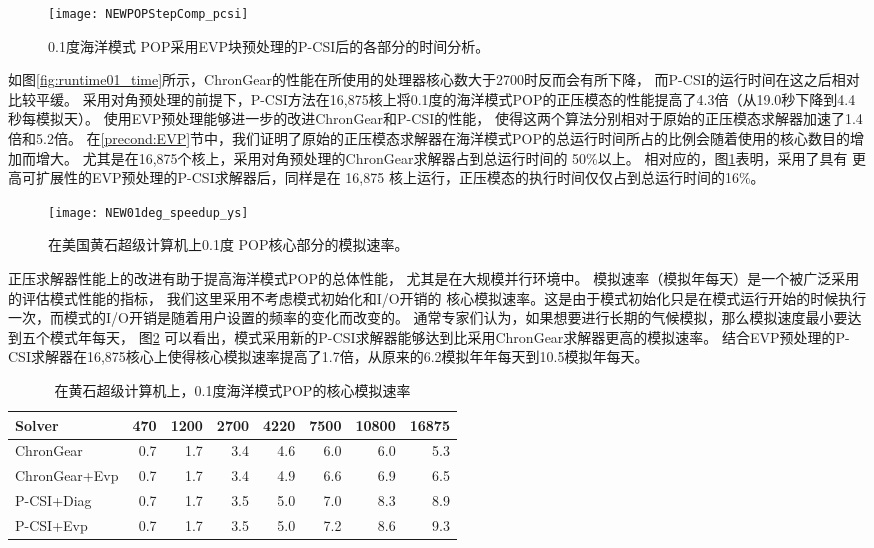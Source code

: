 \begin {figure}
\centering
\texttt{[image: NEWPOPStepComp\_pcsi]}
\caption[] { 0.1度海洋模式 POP采用EVP块预处理的P-CSI后的各部分的时间分析。 \label{fig:StepComp_pcsi}}
\end{figure}

如图\ref{fig:runtime01_time}所示，ChronGear的性能在所使用的处理器核心数大于2700时反而会有所下降，
而P-CSI的运行时间在这之后相对比较平缓。 
采用对角预处理的前提下，P-CSI方法在16,875核上将0.1度的海洋模式POP的正压模态的性能提高了4.3倍（从19.0秒下降到4.4秒每模拟天）。 
使用EVP预处理能够进一步的改进ChronGear和P-CSI的性能， 使得这两个算法分别相对于原始的正压模态求解器加速了1.4倍和5.2倍。
在\ref{precond:EVP}节中，我们证明了原始的正压模态求解器在海洋模式POP的总运行时间所占的比例会随着使用的核心数目的增加而增大。
尤其是在16,875个核上，采用对角预处理的ChronGear求解器占到总运行时间的 50\%以上。 
相对应的，图\ref{fig:StepComp_pcsi}表明，采用了具有 更高可扩展性的EVP预处理的P-CSI求解器后，同样是在 16,875 核上运行，正压模态的执行时间仅仅占到总运行时间的16\%。 

 
\begin {figure}
\centering
\texttt{[image: NEW01deg\_speedup\_ys]}
\caption []{在美国黄石超级计算机上0.1度 POP核心部分的模拟速率。\label {fig:runtime01_rate}}
\end {figure}
正压求解器性能上的改进有助于提高海洋模式POP的总体性能， 尤其是在大规模并行环境中。
模拟速率（模拟年每天）是一个被广泛采用的评估模式性能的指标， 我们这里采用不考虑模式初始化和I/O开销的 核心模拟速率。这是由于模式初始化只是在模式运行开始的时候执行一次，而模式的I/O开销是随着用户设置的频率的变化而改变的。 
通常专家们认为，如果想要进行长期的气候模拟，那么模拟速度最小要达到五个模式年每天\cite{dennis2012computational}， 图\ref{fig:runtime01_rate} 可以看出，模式采用新的P-CSI求解器能够达到比采用ChronGear求解器更高的模拟速率。 
结合EVP预处理的P-CSI求解器在16,875核心上使得核心模拟速率提高了1.7倍，从原来的6.2模拟年年每天到10.5模拟年每天。 
 
\begin{table}
\begin{center}
\caption {在黄石超级计算机上，0.1度海洋模式POP的核心模拟速率\label{tab:improve_01}}
\begin{tabular}{|l||r|r|r|r|r|r|r|}
\hline
Solver & 470  & 1200   & 2700 & 4220 & 7500 & 10800 & 16875\\\hline
\hline
ChronGear     &0.7 &1.7&3.4  &4.6 &6.0 &6.0 &5.3\\\hline
ChronGear+Evp &0.7 &1.7&3.4  &4.9 &6.6 &6.9 &6.5\\\hline
P-CSI+Diag    &0.7 &1.7&3.5  &5.0 &7.0 &8.3 &8.9\\\hline
P-CSI+Evp     &0.7 &1.7&3.5  &5.0 &7.2 &8.6 &9.3\\
\hline
\end{tabular}
\end{center}
\end{table}

